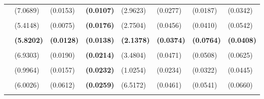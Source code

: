 \documentclass[
  12pt,
]{article}
\begin{document}
\begin{table}[H]
{\begin{tabular}[t]{lll>{}lllll}
 & (7.0689) & (0.0153) & \textbf{(0.0107)} & (2.9623) & (0.0277) & (0.0187) & (0.0342)\\
\addlinespace
\cellcolor{gray!6}{c.hamilton28.panelr20} & \cellcolor{gray!6}{-18.0060} & \cellcolor{gray!6}{0.5006} & \textbf{\cellcolor{gray!6}{0.5034}} & \cellcolor{gray!6}{-5.4259} & \cellcolor{gray!6}{0.7463} & \cellcolor{gray!6}{0.2833} & \cellcolor{gray!6}{0.6407}\\
 & (5.4148) & (0.0075) & \textbf{(0.0176)} & (2.7504) & (0.0456) & (0.0410) & (0.0542)\\
\addlinespace
\textbf{\cellcolor{gray!6}{BIS Basel gap}} & \textbf{\cellcolor{gray!6}{-6.5423}} & \textbf{\cellcolor{gray!6}{0.4791}} & \textbf{\textbf{\cellcolor{gray!6}{0.5023}}} & \textbf{\cellcolor{gray!6}{-4.3181}} & \textbf{\cellcolor{gray!6}{0.7816}} & \textbf{\cellcolor{gray!6}{0.2417}} & \textbf{\cellcolor{gray!6}{0.6759}}\\
\textbf{} & \textbf{(5.8202)} & \textbf{(0.0128)} & \textbf{\textbf{(0.0138)}} & \textbf{(2.1378)} & \textbf{(0.0374)} & \textbf{(0.0764)} & \textbf{(0.0408)}\\
\addlinespace
\cellcolor{gray!6}{c.hamilton28.panelr15} & \cellcolor{gray!6}{-16.2657} & \cellcolor{gray!6}{0.4841} & \textbf{\cellcolor{gray!6}{0.5022}} & \cellcolor{gray!6}{-2.1619} & \cellcolor{gray!6}{0.7701} & \cellcolor{gray!6}{0.2583} & \cellcolor{gray!6}{0.6641}\\
 & (6.9303) & (0.0190) & \textbf{(0.0214)} & (3.4804) & (0.0471) & (0.0508) & (0.0625)\\
\addlinespace
\cellcolor{gray!6}{c.hp3k} & \cellcolor{gray!6}{1.0131} & \cellcolor{gray!6}{0.5102} & \textbf{\cellcolor{gray!6}{0.5017}} & \cellcolor{gray!6}{-0.2747} & \cellcolor{gray!6}{0.7488} & \cellcolor{gray!6}{0.2861} & \cellcolor{gray!6}{0.6440}\\
 & (0.9964) & (0.0157) & \textbf{(0.0232)} & (1.0254) & (0.0234) & (0.0322) & (0.0445)\\
\addlinespace
\cellcolor{gray!6}{c.hamilton13.panelr15} & \cellcolor{gray!6}{-11.6105} & \cellcolor{gray!6}{0.4688} & \textbf{\cellcolor{gray!6}{0.4976}} & \cellcolor{gray!6}{1.2963} & \cellcolor{gray!6}{0.7628} & \cellcolor{gray!6}{0.2861} & \cellcolor{gray!6}{0.6682}\\
 & (6.0026) & (0.0612) & \textbf{(0.0259)} & (6.5172) & (0.0461) & (0.0541) & (0.0660)\\
\addlinespace
\cellcolor{gray!6}{c.hp25k.r15} & \cellcolor{gray!6}{1.0960} & \cellcolor{gray!6}{0.4604} & \textbf{\cellcolor{gray!6}{0.4957}} & \cellcolor{gray!6}{-1.7970} & \cellcolor{gray!6}{0.7691} & \cellcolor{gray!6}{0.2917} & \cellcolor{gray!6}{0.6797}\\

\end{tabular}}
\end{table}
\end{document}
